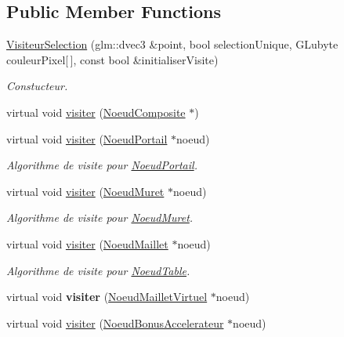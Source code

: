 \subsection*{Public Member Functions}
\begin{DoxyCompactItemize}
\item 
\hypertarget{class_visiteur_selection_abfa92ff155e59d64ab79d2f6530715ff}{}\label{class_visiteur_selection_abfa92ff155e59d64ab79d2f6530715ff} 
\hyperlink{class_visiteur_selection_abfa92ff155e59d64ab79d2f6530715ff}{Visiteur\+Selection} (glm\+::dvec3 \&point, bool selection\+Unique, G\+Lubyte couleur\+Pixel\mbox{[}$\,$\mbox{]}, const bool \&initialiser\+Visite)
\begin{DoxyCompactList}\small\item\em Constucteur. \end{DoxyCompactList}\item 
virtual void \hyperlink{group__inf2990_gaf6d77b8c875bda7f01434cf4e834599c}{visiter} (\hyperlink{class_noeud_composite}{Noeud\+Composite} $\ast$)
\item 
virtual void \hyperlink{group__inf2990_ga5576bd68b32506507c788027a8804cff}{visiter} (\hyperlink{class_noeud_portail}{Noeud\+Portail} $\ast$noeud)
\begin{DoxyCompactList}\small\item\em Algorithme de visite pour \hyperlink{class_noeud_portail}{Noeud\+Portail}. \end{DoxyCompactList}\item 
virtual void \hyperlink{group__inf2990_ga91d77668ef5dad7e42a9d9876d7464da}{visiter} (\hyperlink{class_noeud_muret}{Noeud\+Muret} $\ast$noeud)
\begin{DoxyCompactList}\small\item\em Algorithme de visite pour \hyperlink{class_noeud_muret}{Noeud\+Muret}. \end{DoxyCompactList}\item 
virtual void \hyperlink{group__inf2990_ga6b291b464d019af9696d2916ae58dc23}{visiter} (\hyperlink{class_noeud_maillet}{Noeud\+Maillet} $\ast$noeud)
\begin{DoxyCompactList}\small\item\em Algorithme de visite pour \hyperlink{class_noeud_table}{Noeud\+Table}. \end{DoxyCompactList}\item 
virtual void {\bfseries visiter} (\hyperlink{class_noeud_maillet_virtuel}{Noeud\+Maillet\+Virtuel} $\ast$noeud)
\item 
virtual void \hyperlink{group__inf2990_gaa00c8b4c2a981faf4b6bd5ecdafc3427}{visiter} (\hyperlink{class_noeud_bonus_accelerateur}{Noeud\+Bonus\+Accelerateur} $\ast$noeud)

\end{DoxyCompactItemize}
